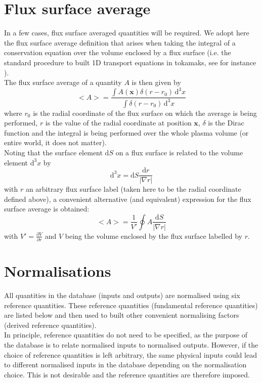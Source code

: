 \documentclass[a4paper]{report}
\begin{document}
\section{Flux surface average}
In a few cases, flux surface averaged quantities will be required. We adopt here the flux surface average definition that arises when taking the integral of a conservation equation over the volume enclosed by a flux surface (i.e. the standard procedure to built 1D transport equations in tokamaks, see for instance \cite{Hinton:RMP1976}).\\
The flux surface average of a quantity $A$ is then given by
\begin{equation}
 <A> = \frac{\int A(\mathbf{x}) \delta(r-r_0) \,\textrm{d}^3{x}}{\int\delta(r-r_0) \,\textrm{d}^3{x}}
\end{equation}
where $r_0$ is the radial coordinate of the flux surface on which the average is being 
performed, $r$ is the value of the radial coordinate at position $\mathbf{x}$, $\delta$ is the Dirac function and the integral is being performed over the whole plasma volume (or entire world, it does not matter).  \\
Noting that the surface element $\textrm{d} S$ on a flux surface is related to the volume element 
$\textrm{d}^3x$ by
\begin{equation}
 \textrm{d}^3x = \textrm{d} S \frac{\textrm{d}r}{|\nabla r|}
\end{equation}
with $r$ an arbitrary flux surface label (taken here to be the radial coordinate defined above), a convenient alternative (and equivalent) expression for the flux surface average is obtained:
\begin{equation} 
 <A> = \frac{1}{V'} \oint A \frac{\textrm{d}S}{|\nabla r|}
\end{equation}
with $V'= \frac{\partial V}{\partial r}$ and $V$ being the volume enclosed by the flux surface labelled by $r$. 

\section{Normalisations}
All quantities in the database (inputs and outputs) are normalised using six reference quantities. These reference quantities (fundamental reference quantities) are listed below and then used to built other convenient normalising factors (derived reference quantities).\\
In principle, reference quantities do not need to be specified, as the purpose of the database is to relate normalised inputs to normalised outputs. 
However, if the choice of reference quantities is left arbitrary, the same physical inputs could lead to different normalised inputs in the database depending on the normalisation choice. This is not desirable and the reference quantities are therefore imposed. 
\end{document}
